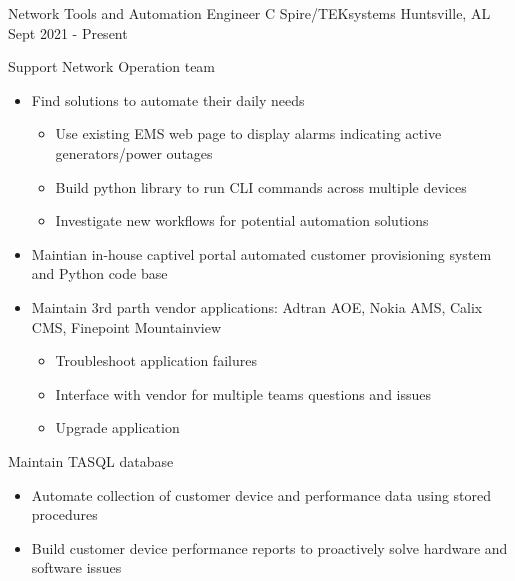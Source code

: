 
\begin{cventries}
  \cventry
    {Network Tools and Automation Engineer} %
    {C Spire/TEKsystems} %
    {Huntsville, AL} %
    {Sept 2021 - Present} %
    {
      \begin{cvitems} %
        \item {Support Network Operation team}
            \begin{itemize}
                \item {Find solutions to automate their daily needs}
                    \begin{itemize}
                        \item {Use existing EMS web page to display alarms indicating active generators/power outages}
                        \item {Build python library to run CLI commands across multiple devices}
                        \item {Investigate new workflows for potential automation solutions}
                    \end{itemize}
                \item {Maintian in-house captivel portal automated customer provisioning system and Python code base}
                \item {Maintain 3rd parth vendor applications: Adtran AOE, Nokia AMS, Calix CMS, Finepoint Mountainview}
                    \begin{itemize}
                        \item {Troubleshoot application failures}
                        \item {Interface with vendor for multiple teams questions and issues}
                        \item {Upgrade application}
                    \end{itemize}
            \end{itemize}
        \item {Maintain TASQL database}
            \begin{itemize}
                \item {Automate collection of customer device and performance data using stored procedures}
                \item {Build customer device performance reports to proactively solve hardware and software issues}
            \end{itemize}

\end{cvitems}}
\end{cventries}
